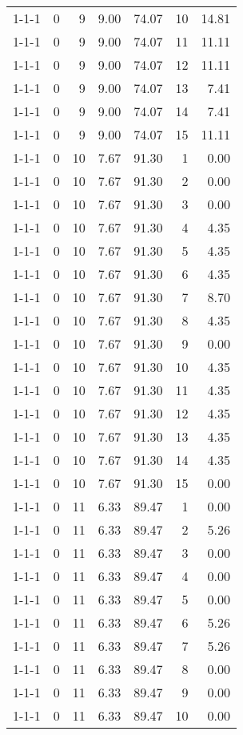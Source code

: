 \begin{tabular}{lrrrrrr}
1-1-1 & 0 & 9 & 9.00 & 74.07 & 10 & 14.81 \\
1-1-1 & 0 & 9 & 9.00 & 74.07 & 11 & 11.11 \\
1-1-1 & 0 & 9 & 9.00 & 74.07 & 12 & 11.11 \\
1-1-1 & 0 & 9 & 9.00 & 74.07 & 13 & 7.41 \\
1-1-1 & 0 & 9 & 9.00 & 74.07 & 14 & 7.41 \\
1-1-1 & 0 & 9 & 9.00 & 74.07 & 15 & 11.11 \\
1-1-1 & 0 & 10 & 7.67 & 91.30 & 1 & 0.00 \\
1-1-1 & 0 & 10 & 7.67 & 91.30 & 2 & 0.00 \\
1-1-1 & 0 & 10 & 7.67 & 91.30 & 3 & 0.00 \\
1-1-1 & 0 & 10 & 7.67 & 91.30 & 4 & 4.35 \\
1-1-1 & 0 & 10 & 7.67 & 91.30 & 5 & 4.35 \\
1-1-1 & 0 & 10 & 7.67 & 91.30 & 6 & 4.35 \\
1-1-1 & 0 & 10 & 7.67 & 91.30 & 7 & 8.70 \\
1-1-1 & 0 & 10 & 7.67 & 91.30 & 8 & 4.35 \\
1-1-1 & 0 & 10 & 7.67 & 91.30 & 9 & 0.00 \\
1-1-1 & 0 & 10 & 7.67 & 91.30 & 10 & 4.35 \\
1-1-1 & 0 & 10 & 7.67 & 91.30 & 11 & 4.35 \\
1-1-1 & 0 & 10 & 7.67 & 91.30 & 12 & 4.35 \\
1-1-1 & 0 & 10 & 7.67 & 91.30 & 13 & 4.35 \\
1-1-1 & 0 & 10 & 7.67 & 91.30 & 14 & 4.35 \\
1-1-1 & 0 & 10 & 7.67 & 91.30 & 15 & 0.00 \\
1-1-1 & 0 & 11 & 6.33 & 89.47 & 1 & 0.00 \\
1-1-1 & 0 & 11 & 6.33 & 89.47 & 2 & 5.26 \\
1-1-1 & 0 & 11 & 6.33 & 89.47 & 3 & 0.00 \\
1-1-1 & 0 & 11 & 6.33 & 89.47 & 4 & 0.00 \\
1-1-1 & 0 & 11 & 6.33 & 89.47 & 5 & 0.00 \\
1-1-1 & 0 & 11 & 6.33 & 89.47 & 6 & 5.26 \\
1-1-1 & 0 & 11 & 6.33 & 89.47 & 7 & 5.26 \\
1-1-1 & 0 & 11 & 6.33 & 89.47 & 8 & 0.00 \\
1-1-1 & 0 & 11 & 6.33 & 89.47 & 9 & 0.00 \\
1-1-1 & 0 & 11 & 6.33 & 89.47 & 10 & 0.00 \\

\end{tabular}
